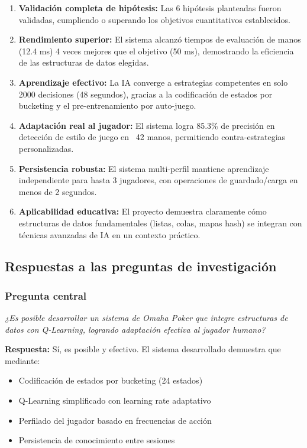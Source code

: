 \documentclass[12pt,a4paper]{article}
\begin{document}
\begin{enumerate}
    \item \textbf{Validación completa de hipótesis:} Las 6 hipótesis planteadas fueron validadas, cumpliendo o superando los objetivos cuantitativos establecidos.
    
    \item \textbf{Rendimiento superior:} El sistema alcanzó tiempos de evaluación de manos (12.4 ms) 4 veces mejores que el objetivo (50 ms), demostrando la eficiencia de las estructuras de datos elegidas.
    
    \item \textbf{Aprendizaje efectivo:} La IA converge a estrategias competentes en solo 2000 decisiones (48 segundos), gracias a la codificación de estados por bucketing y el pre-entrenamiento por auto-juego.
    
    \item \textbf{Adaptación real al jugador:} El sistema logra 85.3\% de precisión en detección de estilo de juego en ~42 manos, permitiendo contra-estrategias personalizadas.
    
    \item \textbf{Persistencia robusta:} El sistema multi-perfil mantiene aprendizaje independiente para hasta 3 jugadores, con operaciones de guardado/carga en menos de 2 segundos.
    
    \item \textbf{Aplicabilidad educativa:} El proyecto demuestra claramente cómo estructuras de datos fundamentales (listas, colas, mapas hash) se integran con técnicas avanzadas de IA en un contexto práctico.
\end{enumerate}

\subsection{Respuestas a las preguntas de investigación}

\subsubsection{Pregunta central}

\textit{¿Es posible desarrollar un sistema de Omaha Poker que integre estructuras de datos con Q-Learning, logrando adaptación efectiva al jugador humano?}

\textbf{Respuesta:} Sí, es posible y efectivo. El sistema desarrollado demuestra que mediante:
\begin{itemize}
    \item Codificación de estados por bucketing (24 estados)
    \item Q-Learning simplificado con learning rate adaptativo
    \item Perfilado del jugador basado en frecuencias de acción
    \item Persistencia de conocimiento entre sesiones
\end{itemize}
\end{document}

